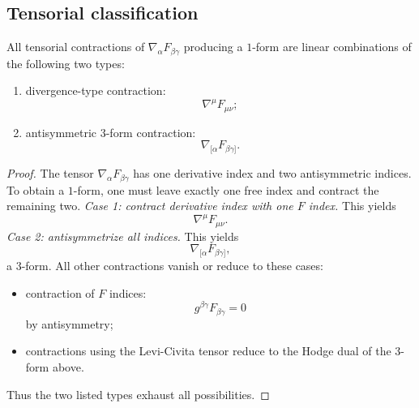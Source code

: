 \subsection{Tensorial classification}
\begin{lemma}
	\label{lem:em-operator-contractions}
	All tensorial contractions of $\nabla_\alpha F_{\beta\gamma}$ producing
	a $1$-form are linear combinations of the following two types:
	\begin{enumerate}
		\item divergence-type contraction:
		      \[
			      \nabla^\mu F_{\mu\nu};
		      \]
		\item antisymmetric $3$-form contraction:
		      \[
			      \nabla_{[\alpha}F_{\beta\gamma]}.
		      \]
	\end{enumerate}
\end{lemma}
\begin{proof}
	The tensor $\nabla_\alpha F_{\beta\gamma}$ has one derivative index and
	two antisymmetric indices.
	To obtain a $1$-form, one must leave exactly one free index and contract
	the remaining two.
	\medskip
	\noindent\emph{Case 1: contract derivative index with one $F$ index.}
	This yields
	\[
		\nabla^\mu F_{\mu\nu}.
	\]
	\medskip
	\noindent\emph{Case 2: antisymmetrize all indices.}
	This yields
	\[
		\nabla_{[\alpha}F_{\beta\gamma]},
	\]
	a $3$-form.
	\medskip
	All other contractions vanish or reduce to these cases:
	\begin{itemize}
		\item contraction of $F$ indices:
		      \[
			      g^{\beta\gamma}F_{\beta\gamma}=0
		      \]
		      by antisymmetry;
		\item contractions using the Levi-Civita tensor reduce to the Hodge
		      dual of the $3$-form above.
	\end{itemize}
	Thus the two listed types exhaust all possibilities.
\end{proof}
